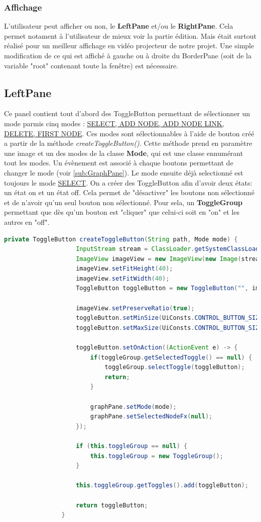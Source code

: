 			\subsubsection{Affichage}
			L'utilisateur peut afficher ou non, le \textbf{LeftPane} et/ou le \textbf{RightPane}. Cela permet notament à l'utilisateur de mieux voir la partie édition. Mais était surtout réalisé pour un meilleur affichage en vidéo projecteur de notre projet.
			Une simple modification de ce qui est affiché à gauche ou à droite du BorderPane (soit de la variable "root" contenant toute la fenêtre) est nécessaire.


		\subsection{LeftPane}
			Ce panel contient tout d'abord des ToggleButton permettant de sélectionner un mode parmis cinq modes : \underline{SELECT, ADD NODE, ADD NODE LINK, DELETE, FIRST NODE}. Ces modes sont sélectionnables à l'aide de bouton créé a partir de la méthode \textit{createToggleButton()}. Cette méthode prend en paramètre une image et un des modes de la classe \textbf{Mode}, qui est une classe ennumérant tout les modes. Un évènement est associé à chaque boutons permettant de changer le mode (voir \ref{sub:GraphPane}). Le mode ensuite déjà selectionné est toujours le mode \underline{SELECT}. On a créer des ToggleButton afin d'avoir deux états: un état on et un état off. Cela permet de "désactiver" les boutons non sélectionné et de n'avoir qu'un seul bouton non sélectionné. Pour sela, un \textbf{ToggleGroup} permettant que dès qu'un bouton est "cliquer" que celui-ci soit en "on" et les autres en "off".

			\begin{lstlisting}[gobble=12, language=java, caption=Création du ToggleButton]
				private ToggleButton createToggleButton(String path, Mode mode) {
					InputStream stream = ClassLoader.getSystemClassLoader().getResourceAsStream(path);
					ImageView imageView = new ImageView(new Image(stream));
					imageView.setFitHeight(40);
					imageView.setFitWidth(40);
					ToggleButton toggleButton = new ToggleButton("", imageView);

					imageView.setPreserveRatio(true);
					toggleButton.setMinSize(UiConsts.CONTROL_BUTTON_SIZE, UiConsts.CONTROL_BUTTON_SIZE);
					toggleButton.setMaxSize(UiConsts.CONTROL_BUTTON_SIZE, UiConsts.CONTROL_BUTTON_SIZE);

					toggleButton.setOnAction((ActionEvent e) -> {
						if(toggleGroup.getSelectedToggle() == null) {
							toggleGroup.selectToggle(toggleButton);
							return;
						}

						graphPane.setMode(mode);
						graphPane.setSelectedNodeFx(null);
					});

					if (this.toggleGroup == null) {
						this.toggleGroup = new ToggleGroup();
					}

					this.toggleGroup.getToggles().add(toggleButton);

					return toggleButton;
				}
			\end{lstlisting}

